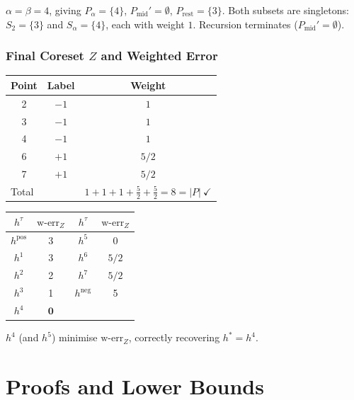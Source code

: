 \documentclass[11pt, a4paper]{article}
\theoremstyle{boxed}
\begin{document}
\smallskip\noindent
$\alpha=\beta=4$, giving $P_\alpha=\{4\}$, $P_{\mathrm{mid}}'=\emptyset$,
$P_{\mathrm{rest}}=\{3\}$.
Both subsets are singletons: $S_2=\{3\}$ and $S_\alpha=\{4\}$, each with weight $1$.
Recursion terminates ($P_{\mathrm{mid}}'=\emptyset$).

\subsubsection*{Final Coreset $Z$ and Weighted Error}

\begin{center}
\begin{minipage}{0.48\textwidth}
\centering\small
\begin{tabular}{ccc}
\hline
Point & Label & Weight\\
\hline
2 & $-1$ & $1$   \\
3 & $-1$ & $1$    \\
4 & $-1$ & $1$    \\
6 & $+1$ & $5/2$ \\
7 & $+1$ & $5/2$\\
\hline
\multicolumn{2}{l}{Total} & $1+1+1+\tfrac{5}{2}+\tfrac{5}{2}=8=|P|\ \checkmark$ \\
\hline
\end{tabular}
\end{minipage}
\hfill
\begin{minipage}{0.48\textwidth}
\centering\small
\begin{tabular}{cc||cc}
\hline
$h^\tau$ & $\mathrm{w\text{-}err}_Z$ & $h^\tau$ & $\mathrm{w\text{-}err}_Z$ \\
\hline
$h^{\mathrm{pos}}$ & 3    & $h^5$ & 0 \\
$h^1$              & 3    & $h^6$ & $5/2$ \\
$h^2$              & 2    & $h^7$ & $5/2$ \\
$h^3$              & 1    & $h^{\mathrm{neg}}$ & 5 \\
$h^4$              & $\mathbf{0}$ & & \\
\hline
\end{tabular}
\end{minipage}
\end{center}

\medskip
\noindent
$h^4$ (and $h^5$) minimise $\mathrm{w\text{-}err}_Z$, correctly recovering $h^* = h^4$.


\section{Proofs and Lower Bounds}
\end{document}
